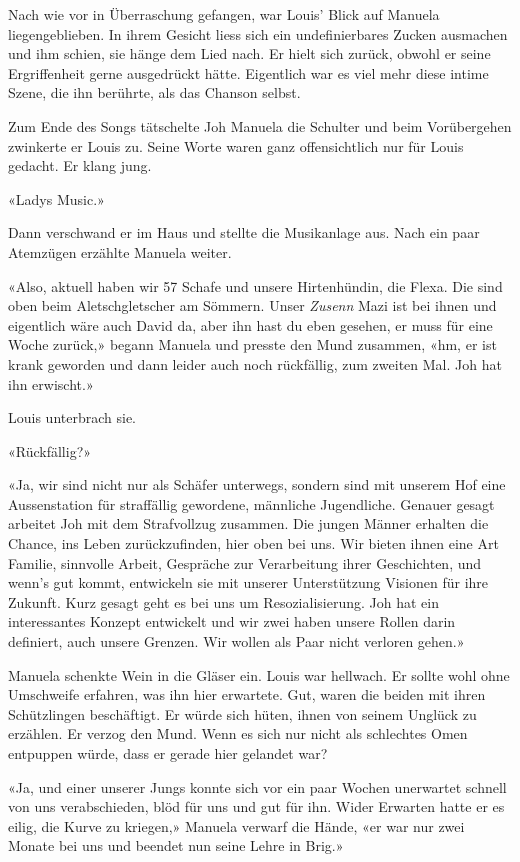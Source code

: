 Nach wie vor in Überraschung gefangen, war Louis’ Blick auf Manuela liegengeblieben.
In ihrem Gesicht liess sich ein undefinierbares Zucken ausmachen und ihm
schien, sie hänge dem Lied nach. Er hielt sich zurück, obwohl er seine
Ergriffenheit gerne ausgedrückt hätte. Eigentlich war es viel mehr diese intime
Szene, die ihn berührte, als das Chanson selbst.

Zum Ende des Songs tätschelte Joh Manuela die Schulter und beim
Vorübergehen zwinkerte er Louis zu. Seine Worte waren ganz
offensichtlich nur für Louis gedacht. Er klang jung.

«Ladys Music.»

Dann verschwand er im Haus und stellte die Musikanlage aus.
Nach ein paar Atemzügen erzählte Manuela weiter.

«Also, aktuell haben wir 57 Schafe und unsere Hirtenhündin, die Flexa.
Die sind oben beim Aletschgletscher am Sömmern. Unser \emph{Zusenn} Mazi
ist bei ihnen und eigentlich wäre auch David da, aber ihn hast du eben
gesehen, er muss für eine Woche zurück,» begann Manuela und presste den
Mund zusammen, «hm, er ist krank geworden und dann leider auch noch
rückfällig, zum zweiten Mal. Joh hat ihn erwischt.»

Louis unterbrach sie.

«Rückfällig?»

«Ja, wir sind nicht nur als Schäfer unterwegs, sondern sind mit unserem
Hof eine Aussenstation für straffällig gewordene, männliche Jugendliche.
Genauer gesagt arbeitet Joh mit dem Strafvollzug zusammen. Die jungen
Männer erhalten die Chance, ins Leben zurückzufinden, hier oben bei uns.
Wir bieten ihnen eine Art Familie, sinnvolle Arbeit, Gespräche zur
Verarbeitung ihrer Geschichten, und wenn’s gut kommt, entwickeln sie mit
unserer Unterstützung Visionen für ihre Zukunft. Kurz gesagt geht es bei
uns um Resozialisierung. Joh hat ein interessantes Konzept entwickelt und 
wir zwei haben unsere Rollen darin definiert, auch unsere Grenzen. Wir wollen
als Paar nicht verloren gehen.»

Manuela schenkte Wein in die Gläser ein. Louis war hellwach. Er sollte wohl ohne Umschweife erfahren, was
ihn hier erwartete. Gut, waren die beiden mit ihren Schützlingen 
beschäftigt. Er würde sich hüten, ihnen von seinem Unglück zu
erzählen. Er verzog den Mund. Wenn es sich nur nicht als schlechtes
Omen entpuppen würde, dass er gerade hier gelandet war?

«Ja, und einer unserer Jungs konnte sich vor ein paar Wochen unerwartet
schnell von uns verabschieden, blöd für uns und gut für ihn.
Wider Erwarten hatte er es eilig, die Kurve zu kriegen,» Manuela verwarf
die Hände, «er war nur zwei Monate bei uns und beendet nun seine Lehre
in Brig.»

